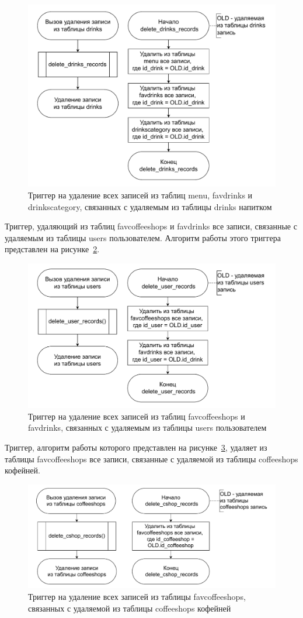 \begin{figure}[H]
	\centering
	\includegraphics[width=0.7\linewidth]{img/trigger_del_drink.pdf}
	\caption{Триггер на удаление всех записей из таблиц  menu, favdrinks и drinkscategory, связанных с удаляемым из таблицы drinks напитком}
	\label{trigger_del_drink}
\end{figure}


Триггер, удаляющий из таблиц favcoffeeshops и favdrinks все записи, связанные с удаляемым из таблицы users пользователем. Алгоритм работы этого триггера представлен на рисунке~\ref{trigger_del_user}.

\begin{figure}[H]
	\centering
	\includegraphics[width=0.7\linewidth]{img/trigger_del_user.pdf}
	\caption{Триггер на удаление всех записей из таблиц  favcoffeeshops и favdrinks, связанных с удаляемым из таблицы users пользователем}
	\label{trigger_del_user}
\end{figure}


Триггер, алгоритм работы которого представлен на рисунке~\ref{trigger_del_coffeeshop}, удаляет из таблицы favcoffeeshops все записи, связанные с удаляемой из таблицы coffeeshops кофейней.

\begin{figure}[H]
	\centering
	\includegraphics[width=0.8\linewidth]{img/trigger_del_coffeeshop.pdf}
	\caption{Триггер на удаление всех записей из таблицы favcoffeeshops, связанных с удаляемой из таблицы coffeeshops кофейней}
	\label{trigger_del_coffeeshop}
\end{figure}


